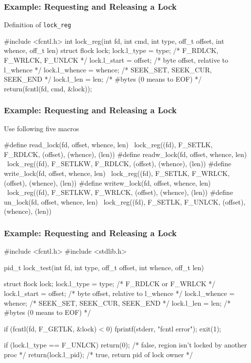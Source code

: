 \documentclass[newPxFont,sthlmFooter,nooffset]{beamer}
\begin{document}
\begin{frame}[t, fragile]





  \frametitle{Example: Requesting and Releasing a Lock}
Definition of \texttt{lock\_reg}

\begin{codedef}
#include <fcntl.h>
int
lock_reg(int fd, int cmd, int type, off_t offset, int whence, off_t len)
{
    struct flock    lock;
    lock.l_type = type;     /* F_RDLCK, F_WRLCK, F_UNLCK */
    lock.l_start = offset;  /* byte offset, relative to l_whence */
    lock.l_whence = whence; /* SEEK_SET, SEEK_CUR, SEEK_END */
    lock.l_len = len;       /* #bytes (0 means to EOF) */
    return(fcntl(fd, cmd, &lock));
}
\end{codedef}
\end{frame}

\begin{frame}[t, fragile]
  \frametitle{Example: Requesting and Releasing a Lock}
Use following five macros
\begin{codedef}
#define	read_lock(fd, offset, whence, len) \
	lock_reg((fd), F_SETLK, F_RDLCK, (offset), (whence), (len))
#define	readw_lock(fd, offset, whence, len) \
	lock_reg((fd), F_SETLKW, F_RDLCK, (offset), (whence), (len))
#define	write_lock(fd, offset, whence, len) \
	lock_reg((fd), F_SETLK, F_WRLCK, (offset), (whence), (len))
#define	writew_lock(fd, offset, whence, len) \
	lock_reg((fd), F_SETLKW, F_WRLCK, (offset), (whence), (len))
#define	un_lock(fd, offset, whence, len) \
	lock_reg((fd), F_SETLK, F_UNLCK, (offset), (whence), (len))
\end{codedef}
\end{frame}

\begin{frame}[t, fragile, allowframebreaks]
  \frametitle{Example: Requesting and Releasing a Lock}
\begin{codedef}
#include <fcntl.h>
#include <stdlib.h>

pid_t lock_test(int fd, int type, off_t offset, int whence, off_t len)
{
    struct flock  lock;
    lock.l_type = type;		/* F_RDLCK or F_WRLCK */
    lock.l_start = offset;	/* byte offset, relative to l_whence */
    lock.l_whence = whence;	/* SEEK_SET, SEEK_CUR, SEEK_END */
    lock.l_len = len;		/* #bytes (0 means to EOF) */

    if (fcntl(fd, F_GETLK, &lock) < 0){
       fprintf(stderr, "fcntl error");
       exit(1);
    }

    if (lock.l_type == F_UNLCK)
       return(0);		/* false, region isn't locked by another proc */
       return(lock.l_pid);	/* true, return pid of lock owner */
}
\end{codedef}
\end{frame}
\end{document}
